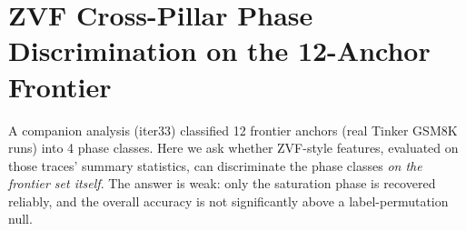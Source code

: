 %
%
%
%
%
%
%

\section{ZVF Cross-Pillar Phase Discrimination on the 12-Anchor Frontier}
\label{sec:zvf-iter34}

A companion analysis (iter33) classified 12 frontier anchors (real Tinker
GSM8K runs) into 4 phase classes. Here we ask whether ZVF-style features,
evaluated on those traces' summary statistics, can discriminate the phase classes
\emph{on the frontier set itself}. The answer is weak: only the
saturation phase is recovered reliably, and the overall accuracy is not
significantly above a label-permutation null.

